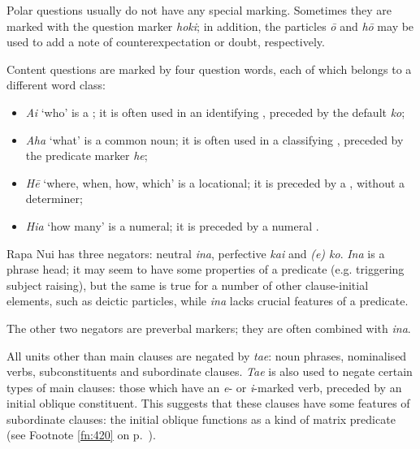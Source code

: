 Polar questions usually do not have any special marking. Sometimes they are marked with the question marker \textit{hoki}; in addition, the particles \textit{{\ꞌ}ō} and \textit{hō} may be used to add a note of counterexpectation or doubt, respectively.

Content questions are marked by four question words, each of which belongs to a different word class:

\begin{itemize}
\item 
\textit{Ai} ‘who’ is a ; it is often used in an identifying , preceded by the default  \textit{ko};

\item 
\textit{Aha} ‘what’ is a common noun; it is often used in a classifying , preceded by the predicate marker \textit{he};

\item 
\textit{Hē} ‘where, when, how, which’ is a locational; it is preceded by a , without a determiner;

\item 
\textit{Hia} ‘how many’ is a numeral; it is preceded by a numeral .

\end{itemize}

Rapa Nui has three  negators: neutral \textit{{\ꞌ}ina}, perfective \textit{kai} and  \textit{(e) ko}. \textit{{\ꞌ}Ina} is a phrase head; it may seem to have some properties of a predicate (e.g. triggering subject raising), but the same is true for a number of other clause-initial elements, such as deictic particles, while \textit{{\ꞌ}ina} lacks crucial features of a predicate.

The other two negators are preverbal markers; they are often combined with \textit{{\ꞌ}ina}.

All units other than main clauses are negated by \textit{ta{\ꞌ}e}: noun phrases, nominalised verbs, subconstituents and subordinate clauses. \textit{Ta{\ꞌ}e} is also used to negate certain types of main clauses: those which have an \textit{e}{}- or \textit{i}{}-marked verb, preceded by an initial oblique constituent. This suggests that these clauses have some features of subordinate clauses: the initial oblique functions as a kind of matrix predicate (see Footnote \ref{fn:420} on p.~\pageref{fn:420}).
